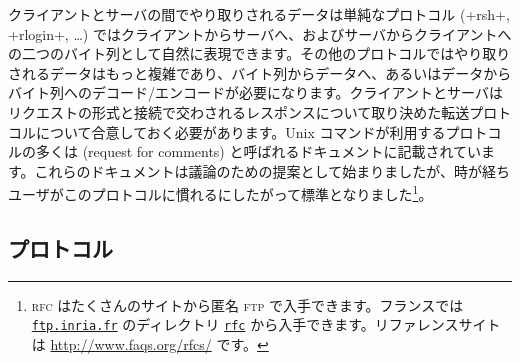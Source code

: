 クライアントとサーバの間でやり取りされるデータは単純なプロトコル (\ml+rsh+, \ml+rlogin+, \ldots) ではクライアントからサーバへ、およびサーバからクライアントへの二つのバイト列として自然に表現できます。その他のプロトコルではやり取りされるデータはもっと複雑であり、バイト列からデータへ、あるいはデータからバイト列へのデコード/エンコードが必要になります。クライアントとサーバはリクエストの形式と接続で交わされるレスポンスについて取り決めた転送プロトコルについて合意しておく必要があります。Unix コマンドが利用するプロトコルの多くは  (request for comments) と呼ばれるドキュメントに記載されています。これらのドキュメントは議論のための提案として始まりましたが、時が経ちユーザがこのプロトコルに慣れるにしたがって標準となりました\footnote{\textsc{rfc} はたくさんのサイトから匿名 \textsc{ftp} で入手できます。フランスでは \href{ftp://ftp.inria.fr}{\texttt{ftp.inria.fr}} のディレクトリ \href{ftp://ftp.inria.fr/pub/rfc/}{\texttt{rfc}} から入手できます。リファレンスサイトは \url{http://www.faqs.org/rfcs/} です。}。

\subsection*{ プロトコル}

